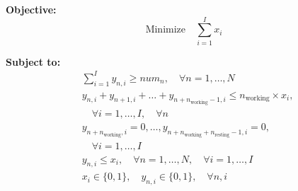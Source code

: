\documentclass{article}
\begin{document}
\textbf{Objective:}
\[
\text{Minimize} \quad \sum_{i=1}^{I} x_i
\]

\textbf{Subject to:}
\begin{align*}
&\sum_{i=1}^{I} y_{n,i} \geq num_n, \quad \forall n = 1, \ldots, N \\
&y_{n,i} + y_{n+1,i} + \ldots + y_{n+n_{\text{working}}-1,i} \leq n_{\text{working}} \times x_i, \\
&\quad \forall i = 1, \ldots, I, \quad \forall n \\
&y_{n+n_{\text{working}},i} = 0, \ldots, y_{n+n_{\text{working}}+n_{\text{resting}}-1,i} = 0, \\
&\quad \forall i = 1, \ldots, I \\
&y_{n,i} \leq x_i, \quad \forall n = 1, \ldots, N, \quad \forall i = 1, \ldots, I \\
&x_i \in \{0,1\}, \quad y_{n,i} \in \{0,1\}, \quad \forall n, i
\end{align*}
\end{document}
